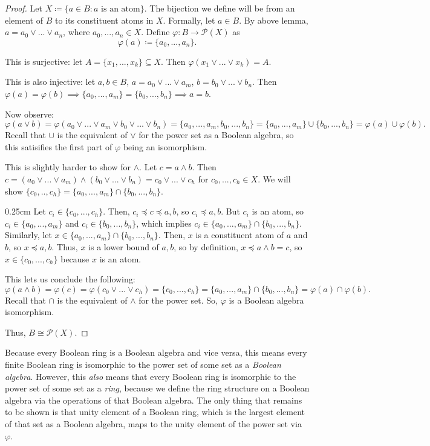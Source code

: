\documentclass[10pt, letterpaper]{article}
\newcommand{\func}[3]{{#1}:#2\rightarrow #3}
\newcommand{\set}[1]{\{#1\}}
\newcommand{\powerset}[1]{\mathcal{P}(#1)}
\newenvironment{tabOver}[1]
{\begin{adjustwidth}{#1cm}{}}{\end{adjustwidth}}
\theoremstyle{definition}
\begin{document}
\begin{proof}
	Let \(X\coloneqq\set{a\in B:a\text{ is an atom}}\). The bijection we define
	will be from an element of \(B\) to its constituent atoms in \(X\). Formally,
	let \(a\in B\). By above lemma, \(a=a_0\vee ...\vee a_n\), where \(a_0,...,a_n\in X\).
	Define \(\func{\varphi}{B}{\powerset{X}}\) as \[\varphi(a)\coloneqq\set{a_0,...,a_n}.\]

	This is surjective: let \(A=\set{x_1,...,x_k}\subseteq X\). Then
	\(\varphi(x_1\vee...\vee x_k)= A\).

	This is also injective: let \(a,b\in B\), \(a=a_0\vee...\vee a_m\), \(b=b_0\vee...\vee b_n\).
	Then \(\varphi(a)=\varphi(b)\implies \set{a_0,...,a_m}=\set{b_0,...,b_n}\implies a=b\).

	Now observe: \[\varphi(a\vee b) =\varphi(a_0\vee...\vee a_m\vee b_0\vee...\vee b_n)=
	\set{a_0,...,a_m,b_0,...,b_n}=\set{a_0,...,a_m}\cup\set{b_0,...,b_n}=
	\varphi(a)\cup\varphi(b).\]
	Recall that \(\cup\) is the equivalent of \(\vee\) for the power set
	as a Boolean algebra, so this satisifies the first part of \(\varphi\) being an
	isomorphism.

	This is slightly harder to show for \(\wedge\). Let \(c=a\wedge b\).
	Then \(c=(a_0\vee...\vee a_m)\wedge(b_0\vee...\vee b_n)=c_0\vee...\vee c_h\) for
	\(c_0,...,c_h\in X\). 
	We will show \(\set{c_0,..,c_h}=\set{a_0,...,a_m}\cap\set{b_0,...,b_n}\).

	\begin{tabOver}{0.25}
		Let \(c_i\in\set{c_0,...,c_h}\). Then,
		\(c_i\preceq c\preceq a,b\), so \(c_i\preceq a,b\). But \(c_i\) is an atom,
		so \(c_i\in \set{a_0,...,a_m}\) and \(c_i\in\set{b_0,...,b_n}\),
		which implies \(c_i\in\set{a_0,...,a_m}\cap\set{b_0,...,b_n}\). Similarly,
		let \(x\in\set{a_0,...,a_m}\cap\set{b_0,...,b_n}\). Then, \(x\) is a constituent atom
		of \(a\) and \(b\), so \(x\preceq a, b\). Thus, \(x\) is a lower bound of \(a,b\), so
		by definition, \(x\preceq a\wedge b=c\), so \(x\in\set{c_0,...,c_h}\) 
		because \(x\) is an atom.
	\end{tabOver}

	This lets us conclude the following:
	\[\varphi(a\wedge b)=\varphi(c)=\varphi(c_0\vee...\vee c_h)=
		\set{c_0,...,c_h}=\set{a_0,...,a_m}\cap\set{b_0,...,b_n}=
	\varphi(a)\cap\varphi(b).\]
	Recall that \(\cap\) is the equivalent of \(\wedge\) for the power set. So,
	\(\varphi\) is a Boolean algebra isomorphism.

	Thus, \(B\cong \powerset{X}\).
\end{proof}
Because every Boolean ring is a Boolean algebra and vice versa,
this means every finite Boolean ring is isomorphic to the power set of some set
as a \textit{Boolean algebra}.
However, this \textit{also} means that every Boolean ring is isomorphic to the
power set of some set as a \textit{ring}, because we define the ring structure
on a Boolean algebra via the operations of that Boolean algebra. The only
thing that remains to be shown is that unity element of a Boolean ring, which is
the largest element of that set as a Boolean algebra, maps to the unity element
of the power set via \(\varphi\).
\end{document}
